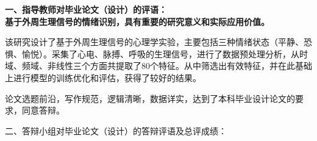 \cleardoublepage{}

{
    \bfseries
    \noindent 一、指导教师对毕业论文（设计）的评语：\\
    \vskip 3mm
    \mdseries
    基于外周生理信号的情绪识别，具有重要的研究意义和实际应用价值。

    该研究设计了基于外周生理信号的心理学实验，主要包括三种情绪状态（平静、恐惧、愉悦）。采集了心电、脉搏、呼吸的生理信号，进行了数据预处理分析，从时域、频域、非线性三个方面共提取了80个特征。从中筛选出有效特征，并在此基础上进行模型的训练优化和评估，获得了较好的结果。
    
    论文选题前沿，写作规范，逻辑清晰，数据详实，达到了本科毕业设计论文的要求，同意答辩。
    \bfseries
    \vskip 8mm
    \signature{指导教师（签名）}

    \noindent 二、答辩小组对毕业论文（设计）的答辩评语及总评成绩：\\

    \mbox{} \vfill

    \finaleval[ ][ ][ ][ ][ ]

    \signature{负责人（签名）}
}
